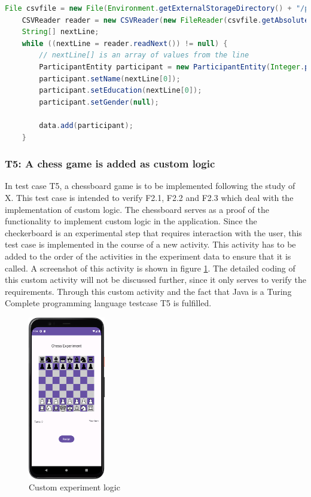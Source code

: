 \begin{lstlisting}[language=java,label=t3b,lineskip={0pt}, caption=Collect time needed to conduct experiment (b), basicstyle=\scriptsize, captionpos=b]
    File csvfile = new File(Environment.getExternalStorageDirectory() + "/participantData.csv");
    CSVReader reader = new CSVReader(new FileReader(csvfile.getAbsolutePath()));
    String[] nextLine;
    while ((nextLine = reader.readNext()) != null) {
        // nextLine[] is an array of values from the line
        ParticipantEntity participant = new ParticipantEntity(Integer.parseInt(nextLine[0]));
        participant.setName(nextLine[0]);
        participant.setEducation(nextLine[0]);
        participant.setGender(null);
    
        data.add(participant);
    }
\end{lstlisting}

\newpage

\subsubsection*{T5: A chess game is added as custom logic}

In test case T5, a chessboard game is to be implemented following the study of X. This test case is intended to verify F2.1, F2.2 and F2.3 which deal with the implementation of custom logic. The chessboard serves as a proof of the functionality to implement custom logic in the application. Since the checkerboard is an experimental step that requires interaction with the user, this test case is implemented in the course of a new activity. This activity has to be added to the order of the activities in the experiment data to ensure that it is called. A screenshot of this activity is shown in figure \ref{fig:chess}. The detailed coding of this custom activity will not be discussed further, since it only serves to verify the requirements. Through this custom activity and the fact that Java is a Turing Complete programming language testcase T5 is fulfilled.



\begin{figure}[htbp]
    \centering
    \includegraphics[width=0.3\textwidth, keepaspectratio]{content/07_evaluation_of_the_solution/Screenshot_Chess.png}
    \caption{Custom experiment logic}    
    \label{fig:chess}
\end{figure}

